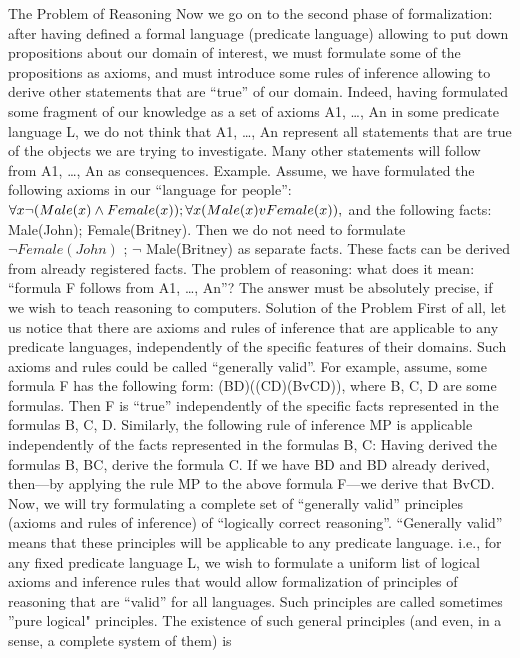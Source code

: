 The Problem of Reasoning
Now we go on to the second phase of formalization: after having defined a formal language (predicate
language) allowing to put down propositions about our domain of interest, we must formulate some of the
propositions as axioms, and must introduce some rules of inference allowing to derive other statements
that are ``true'' of our domain.
Indeed, having formulated some fragment of our knowledge as a set of axioms A1, \ldots , An in some
predicate language L, we do not think that A1, \ldots , An represent all statements that are true of the objects
we are trying to investigate. Many other statements will follow from A1, \ldots , An as consequences.
Example. Assume, we have formulated the following axioms in our ``language for people'':
\(\forall x\neg (Male(x)\wedge Female(x)); \forall x(Male(x)vFemale(x)),\) and the following facts: Male(John);
Female(Britney). Then we do not need to formulate \(\neg Female(John)\) ; \(\neg\) Male(Britney) as separate facts.
These facts can be derived from already registered facts.
The problem of reasoning: what does it mean: ``formula F follows from A1, \ldots , An''? The answer must be
absolutely precise, if we wish to teach reasoning to computers.
Solution of the Problem
First of all, let us notice that there are axioms and rules of inference that are applicable to any predicate
languages, independently of the specific features of their domains. Such axioms and rules could be called
``generally valid''.
For example, assume, some formula F has the following form:
(B\IMPLIES D)\IMPLIES ((C\IMPLIES D)\IMPLIES (BvC\IMPLIES D)),
where B, C, D are some formulas. Then F is ``true'' independently of the specific facts represented in the
formulas B, C, D.
Similarly, the following rule of inference MP is applicable independently of the facts represented in the
formulas B, C:
Having derived the formulas B, B\IMPLIES C, derive the formula C.
If we have B\IMPLIES D and B\IMPLIES D already derived, then---by applying the rule MP to the above formula F---we
derive that BvC\IMPLIES D.
Now, we will try formulating a complete set of ``generally valid'' principles (axioms and rules of
inference) of ``logically correct reasoning''. ``Generally valid'' means that these principles will be
applicable to any predicate language. i.e., for any fixed predicate language L, we wish to formulate a
uniform list of logical axioms and inference rules that would allow formalization of principles of
reasoning that are ``valid'' for all languages. Such principles are called sometimes ''pure logical"
principles. The existence of such general principles (and even, in a sense, a complete system of them) is
